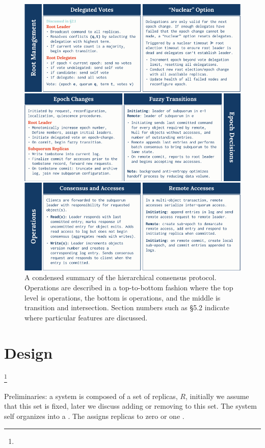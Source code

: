 \documentclass[10pt,twocolumn]{article}
\begin{document}
\begin{figure}[hbtp]
  \centering
  \minipage{\textwidth}
      \includegraphics[width=\linewidth]{figures/hc_operation_summary}
      \caption{A condensed summary of the hierarchical consensus protocol. Operations are described in a top-to-bottom fashion where the top level is \roo operations, the bottom is \sub operations, and the middle is transition and intersection. Section numbers such as §5.2 indicate where particular features are discussed.}
      \label{fig:hc_operation_summary}
  \endminipage
\end{figure}

\section*{Design}\footnote{}

Preliminaries: a system is composed of a set of replicas, $R$, initially we
assume that this set is fixed, later we discuss adding or removing to this
set.
The system self organizes into a \roo.
The \roo assigns replicas to zero or one \subs.
\end{document}
